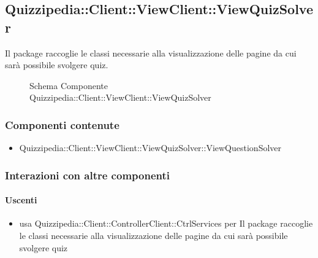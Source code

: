 \subsection{Quizzipedia::Client::ViewClient::ViewQuizSolver}
Il package raccoglie le classi necessarie alla visualizzazione delle pagine da cui sarà possibile svolgere quiz.
\begin{figure}[H]
\centering
\noindent{}
\caption[Schema Componente Quizzipedia::Client::ViewClient::ViewQuizSolver]{Schema Componente Quizzipedia::Client::ViewClient::ViewQuizSolver}
\end{figure}
\subsubsection{Componenti contenute}
\begin{itemize}
\item Quizzipedia::Client::ViewClient::ViewQuizSolver::ViewQuestionSolver
\end{itemize}
\subsubsection{Interazioni con altre componenti}
\paragraph{Uscenti}
\begin{itemize}
\item usa Quizzipedia::Client::ControllerClient::CtrlServices per Il package raccoglie le classi necessarie alla visualizzazione delle pagine da cui sarà possibile svolgere quiz
\end{itemize}
